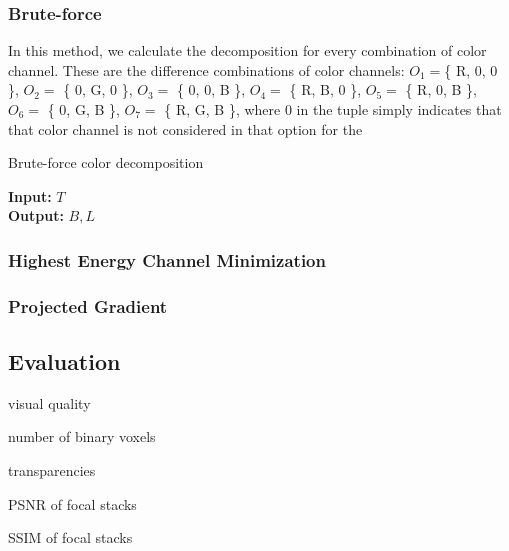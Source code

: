 \subsubsection{Brute-force}
In this method, we calculate the decomposition for every combination of color channel. These are the difference combinations of color channels: $O_1 = $\{ R, 0, 0 \}, $O_2 = $ \{ 0, G, 0 \}, $O_3 = $ \{ 0, 0, B \}, $O_4 = $ \{ R, B, 0 \}, $O_5 = $ \{ R, 0, B \}, $O_6 = $ \{ 0, G, B \}, $O_7 = $ \{ R, G, B \}, where 0 in the tuple simply indicates that that color channel is not considered in that option for the 

\begin{algorithm}
    \caption{Brute-force color decomposition}
    \label{alg:bruteforce}
    \hspace*{\algorithmicindent}\textbf{Input:} $T$\\
    \hspace*{\algorithmicindent}\textbf{Output:} $B, L$
    \begin{algorithmic}[1]
        \ENDFOR
    \end{algorithmic}
\end{algorithm}

\subsubsection{Highest Energy Channel Minimization}

\subsubsection{Projected Gradient}

\subsection{Evaluation}
visual quality

number of binary voxels

transparencies

PSNR of focal stacks

SSIM of focal stacks

